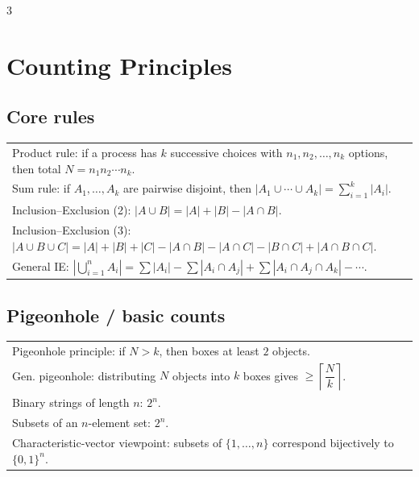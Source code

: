 \documentclass[10pt]{article}
\begin{document}
\begin{multicols*}{3}
\footnotesize
\raggedcolumns

\section*{Counting Principles}

\subsection*{Core rules}
\vspace{-1pt}
\begin{tabular}{@{}p{}@{}}
Product rule: if a process has $k$ successive choices with $n_1,n_2,\dots,n_k$ options, then total $N=n_1n_2\cdots n_k$.\\
Sum rule: if $A_1,\dots,A_k$ are pairwise disjoint, then $|A_1\cup\cdots\cup A_k|=\sum_{i=1}^k |A_i|$.\\
Inclusion--Exclusion (2): $|A\cup B|=|A|+|B|-|A\cap B|$.\\
Inclusion--Exclusion (3): $|A\cup B\cup C|=|A|+|B|+|C|-|A\cap B|-|A\cap C|-|B\cap C|+|A\cap B\cap C|$.\\
General IE: $\left|\bigcup_{i=1}^n A_i\right|=\sum |A_i|-\sum |A_i\cap A_j|+\sum |A_i\cap A_j\cap A_k|-\cdots$.\\
\end{tabular}

\subsection*{Pigeonhole / basic counts}
\vspace{-1pt}
\begin{tabular}{@{}p{}@{}}
Pigeonhole principle: if $N>k$, then boxes at least $2$ objects.\\
\vspace{-10pt}
Gen. pigeonhole: distributing $N$ objects into $k$ boxes gives $\ge \left\lceil \dfrac{N}{k}\right\rceil$.\\
\vspace{-10pt}
Binary strings of length $n$: $2^n$.\\
\vspace{-10pt}
Subsets of an $n$-element set: $2^n$.\\
Characteristic-vector viewpoint: subsets of $\{1,\dots,n\}$ correspond bijectively to $\{0,1\}^n$.\\
\end{tabular}


\end{multicols*}
\end{document}
